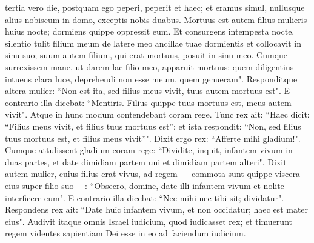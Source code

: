 \begin{biblechapter}
\verse tertia vero die, postquam ego peperi, peperit et haec; et eramus simul, nullusque alius nobiscum in domo, exceptis nobis duabus. 
\verse Mortuus est autem filius mulieris huius nocte; dormiens quippe oppressit eum. 
\verse Et consurgens intempesta nocte, silentio tulit filium meum de latere meo ancillae tuae dormientis et collocavit in sinu suo; suum autem filium, qui erat mortuus, posuit in sinu meo. 
\verse Cumque surrexissem mane, ut darem lac filio meo, apparuit mortuus; quem diligentius intuens clara luce, deprehendi non esse meum, quem genueram". 
\verse Responditque altera mulier: “Non est ita, sed filius meus vivit, tuus autem mortuus est". E contrario illa dicebat: “Mentiris. Filius quippe tuus mortuus est, meus autem vivit". Atque in hunc modum contendebant coram rege. 
\verse Tunc rex ait: “Haec dicit: “Filius meus vivit, et filius tuus mortuus est”; et ista respondit: “Non, sed filius tuus mortuus est, et filius meus vivit”".  
\verse Dixit ergo rex: “Afferte mihi gladium!". Cumque attulissent gladium coram rege: 
\verse “Dividite, inquit, infantem vivum in duas partes, et date dimidiam partem uni et dimidiam partem alteri". 
\verse Dixit autem mulier, cuius filius erat vivus, ad regem — commota sunt quippe viscera eius super filio suo —: “Obsecro, domine, date illi infantem vivum et nolite interficere eum". E contrario illa dicebat: “Nec mihi nec tibi sit; dividatur". 
\verse Respondens rex ait: “Date huic infantem vivum, et non occidatur; haec est mater eius". 
\verse Audivit itaque omnis Israel iudicium, quod iudicasset rex; et timuerunt regem videntes sapientiam Dei esse in eo ad faciendum iudicium. 
\end{biblechapter}

